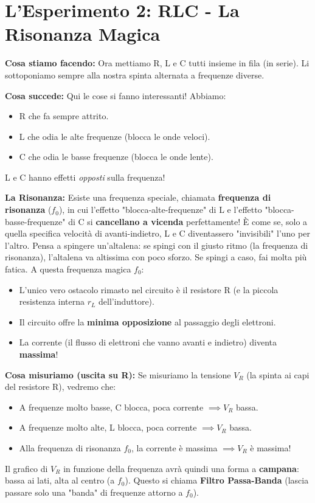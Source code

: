 \documentclass[a4paper, 11pt]{article}
\begin{document}
\section*{L'Esperimento 2: RLC - La Risonanza Magica}

\textbf{Cosa stiamo facendo:} Ora mettiamo R, L e C tutti insieme in fila (in serie). Li sottoponiamo sempre alla nostra spinta alternata a frequenze diverse.

\textbf{Cosa succede:} Qui le cose si fanno interessanti! Abbiamo:
\begin{itemize}
    \item R che fa sempre attrito.
    \item L che odia le alte frequenze (blocca le onde veloci).
    \item C che odia le basse frequenze (blocca le onde lente).
\end{itemize}
L e C hanno effetti \textit{opposti} sulla frequenza!

\textbf{La Risonanza:} Esiste una frequenza speciale, chiamata \textbf{frequenza di risonanza} ($f_0$), in cui l'effetto "blocca-alte-frequenze" di L e l'effetto "blocca-basse-frequenze" di C si \textbf{cancellano a vicenda} perfettamente!
È come se, solo a quella specifica velocità di avanti-indietro, L e C diventassero "invisibili" l'uno per l'altro.
Pensa a spingere un'altalena: se spingi con il giusto ritmo (la frequenza di risonanza), l'altalena va altissima con poco sforzo. Se spingi a caso, fai molta più fatica.
A questa frequenza magica $f_0$:
\begin{itemize}
    \item L'unico vero ostacolo rimasto nel circuito è il resistore R (e la piccola resistenza interna $r_L$ dell'induttore).
    \item Il circuito offre la \textbf{minima opposizione} al passaggio degli elettroni.
    \item La corrente (il flusso di elettroni che vanno avanti e indietro) diventa \textbf{massima}!
\end{itemize}

\textbf{Cosa misuriamo (uscita su R):}
Se misuriamo la tensione $V_R$ (la spinta ai capi del resistore R), vedremo che:
\begin{itemize}
    \item A frequenze molto basse, C blocca, poca corrente $\implies V_R$ bassa.
    \item A frequenze molto alte, L blocca, poca corrente $\implies V_R$ bassa.
    \item Alla frequenza di risonanza $f_0$, la corrente è massima $\implies V_R$ è massima!
\end{itemize}
Il grafico di $V_R$ in funzione della frequenza avrà quindi una forma a \textbf{campana}: bassa ai lati, alta al centro (a $f_0$). Questo si chiama \textbf{Filtro Passa-Banda} (lascia passare solo una "banda" di frequenze attorno a $f_0$).
\end{document}
